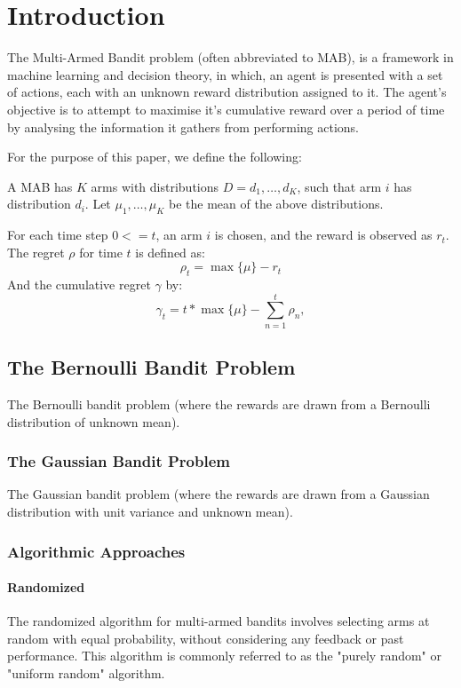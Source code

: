\chapter{Introduction}
\label{cha:chapter1} %

The Multi-Armed Bandit problem (often abbreviated to MAB), is a framework in machine learning and decision theory, in which, an agent is presented with a set of actions, each with an unknown reward distribution assigned to it. The agent's objective is to attempt to maximise it's cumulative reward over a period of time by analysing the information it gathers from performing actions.

For the purpose of this paper, we define the following:

A MAB has $K$ arms with distributions $D = {d_1, \dots , d_K}$, such that arm $i$ has distribution $d_i$. Let $\mu_1, \dots , \mu_K$ be the mean of the above distributions.

For each time step $0 <= t$, an arm $i$ is chosen, and the reward is observed as $r_t$. The regret $\rho$ for time $t$ is defined as: $$\rho_t = \max\{\mu\} - r_t$$
And the cumulative regret $\gamma$ by:
$$\gamma_t = t * \max\{\mu\} - \sum _{n=1}^{t}{\rho_n},$$

\section{The Bernoulli Bandit Problem}
\label{sec:BernoulliBandit}

The Bernoulli bandit problem (where the rewards are drawn from a Bernoulli distribution of unknown mean).
 
\subsection{The Gaussian Bandit Problem}
\label{sec:GaussianBandit}

The Gaussian bandit problem (where the rewards are drawn from a Gaussian distribution with unit variance and unknown mean).

\subsection{Algorithmic Approaches}
\label{sec:Algorithms}

\subsubsection{Randomized}
\label{sec:randomized}
The randomized algorithm for multi-armed bandits involves selecting arms at random with equal probability, without considering any feedback or past performance. This algorithm is commonly referred to as the "purely random" or "uniform random" algorithm.

